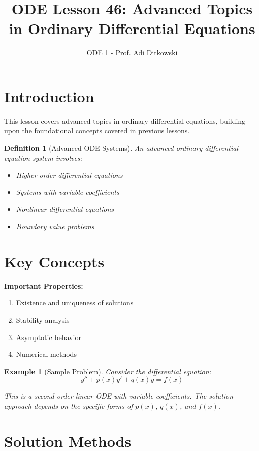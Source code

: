 \documentclass[12pt]{article}
\title{ODE Lesson 46: Advanced Topics in Ordinary Differential Equations}
\author{ODE 1 - Prof. Adi Ditkowski}
\date{}
\newtheorem{definition}{Definition}
\newtheorem{example}{Example}
\begin{document}
\maketitle

\section{Introduction}

This lesson covers advanced topics in ordinary differential equations, building upon the foundational concepts covered in previous lessons.

\begin{definition}[Advanced ODE Systems]
An advanced ordinary differential equation system involves:
\begin{itemize}
\item Higher-order differential equations
\item Systems with variable coefficients
\item Nonlinear differential equations
\item Boundary value problems
\end{itemize}
\end{definition}

\section{Key Concepts}

\begin{keypoint}
\textbf{Important Properties:}
\begin{enumerate}
\item Existence and uniqueness of solutions
\item Stability analysis
\item Asymptotic behavior
\item Numerical methods
\end{enumerate}
\end{keypoint}

\begin{example}[Sample Problem]
Consider the differential equation:
\[y'' + p(x)y' + q(x)y = f(x)\]

This is a second-order linear ODE with variable coefficients. The solution approach depends on the specific forms of $p(x)$, $q(x)$, and $f(x)$.
\end{example}

\section{Solution Methods}
\end{document}
